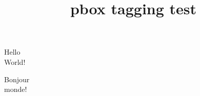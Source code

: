 \documentclass{article}
\title{pbox tagging test}
\begin{document}
%

\parbox[b]{1.5cm}{Hello\\World!}%
\parbox[t]{1.5cm}{Bonjour\\monde!}
\end{document}
